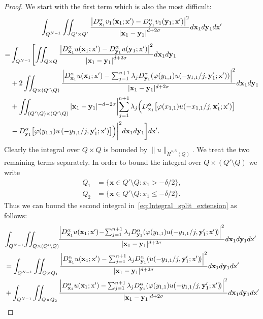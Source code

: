 \documentclass[10pt]{amsart}
\theoremstyle{definition}\newtheorem{defi}[theo]{Definition}\newtheorem{rema}[theo]{Remark}\newtheorem{exam}[theo]{Example}\newtheorem{exem}[theo]{Example}\newtheorem{nota}[theo]{Notation}
\newcommand\1{{\ensuremath {\mathds 1} }}
\newcommand{\bx}{\mathbf{x}}
\newcommand{\by}{\mathbf{y}}
\newcommand{\sx}{\textup{x}}
\begin{document}
\begin{proof}
We start with the first term which is also the most difficult:
\begin{multline}\label{eq:Integral_split_extension}
\int_{Q^{N-1}} \iint_{Q'\times Q'} \frac{\left|D^\alpha_{\bx_1} v_1(\bx_1;\sx')-D^\alpha_{\by_1} v_1(\by_1; \sx')\right|^2}{\left|\bx_1-\by_1\right|^{d+2\sigma}}d\bx_1 d\by_1 d\sx'\\[5pt]
\begin{aligned}
=&
\int_{Q^{N-1}} \Biggl[
\iint_{Q\times Q} \frac{\left|D^\alpha_{\bx_1} u(\bx_1;\sx')-D^\alpha_{\by_1} u(\by_1; \sx')\right|^2}{\left|\bx_1-\by_1\right|^{d+2\sigma}}d\bx_1 d\by_1\\
& + 2\iint_{Q\times (Q'\setminus Q)} \frac{\left|D^\alpha_{\bx_1} u(\bx_1;\sx')-\sum_{j=1}^{n+1}\lambda_j D^\alpha_{\by_1} (\varphi(y_{1,1}) u(-y_{1,1}/j, \by_1'; \sx'))\right|^2}{|\bx_1-\by_1|^{d+2\sigma}}d\bx_1 d\by_1\\
& +
\iint_{(Q'\setminus Q)\times (Q'\setminus Q)} |\bx_1-\by_1|^{-d-2\sigma}\biggl|\sum_{j=1}^{n+1}\lambda_j \Bigl(D^\alpha_{\bx_1} \bigl[\varphi(x_{1,1}) u(-x_{1,1}/j, \bx_1';\sx')\bigr]\\
& -D^\alpha_{\by_1} \bigl[\varphi(y_{1,1}) u\left(-y_{1,1}/j, \by_1';\sx'\right)\bigr]\Bigr)\biggr|^2 d\bx_1 d\by_1 \biggr]d\sx'.
\end{aligned}
\end{multline}
Clearly the integral over $Q\times Q$ is bounded by $\|u\|_{\dot{H}^{s,N}(Q)}$. We treat the two remaining terms separately. In order to bound the integral over $Q\times (Q'\setminus Q)$ we write
\begin{align*}
Q_1 &=\{\bx\in Q'\setminus Q: x_1>-\delta/2\},\\
Q_2 &=\{\bx\in Q'\setminus Q: x_1\leq-\delta/2\}.
\end{align*}
Thus we can bound the second integral in~\eqref{eq:Integral_split_extension} as follows:
\begin{multline*}
\!\!\int_{Q^{N-1}}\!\iint_{Q\times (Q'\setminus Q)}\!\!\frac{\left|D^\alpha_{\bx_1} u(\bx_1;\sx')\!-\!\sum_{j=1}^{n+1}\lambda_j D^\alpha_{\by_1} (\varphi(y_{1,1}) u(-y_{1,1}/j, \by_1'; \sx')\!)\right|^2}{|\bx_1-\by_1|^{d+2\sigma}}d\bx_1 d\by_1 d\sx'\\
\begin{aligned}
&=
\int_{Q^{N-1}}\iint_{Q\times Q_1} \frac{\left|D^\alpha_{\bx_1} u(\bx_1;\sx')-\sum_{j=1}^{n+1}\lambda_j D^\alpha_{\by_1} (u(-y_{1,1}/j, \by_1'; \sx')\!)\right|^2}{|\bx_1-\by_1|^{d+2\sigma}}d\bx_1 d\by_1 d\sx'\\
&+
\int_{Q^{N-1}}\iint_{Q\times Q_2} \frac{\left|D^\alpha_{\bx_1} u(\bx_1;\sx')-\sum_{j=1}^{n+1}\lambda_j D^\alpha_{\by_1} (\varphi(y_{1,1}) u(-y_{1,1}/j, \by_1'; \sx')\!)\right|^2}{|\bx_1-\by_1|^{d+2\sigma}}d\bx_1 d\by_1 d\sx'\\

\end{aligned}
\end{multline*}
\end{proof}
\end{document}
